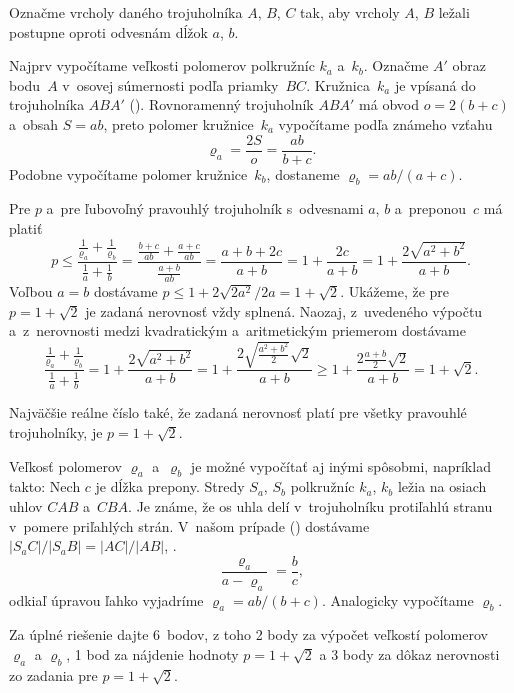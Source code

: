{%
Označme vrcholy daného trojuholníka $A$, $B$, $C$ tak, aby vrcholy $A$, $B$ ležali postupne oproti odvesnám dĺžok $a$, $b$.
%

Najprv vypočítame veľkosti polomerov polkružníc $k_a$ a~$k_b$. Označme $A'$ obraz bodu~$A$ v~osovej súmernosti podľa priamky~$BC$. Kružnica~$k_a$ je vpísaná do trojuholníka $ABA'$ (\obr). Rovnoramenný trojuholník $ABA'$ má obvod $o=2(b+c)$ a~obsah $S=ab$, preto polomer kružnice~$k_a$ vypočítame podľa známeho vzťahu
$$
\varrho_a = \frac{2S}o = \frac{ab}{b+c}.
$$
Podobne vypočítame polomer kružnice~$k_b$, dostaneme $\varrho_b=ab/(a+c)$.

Pre $p$ a~pre ľubovoľný pravouhlý trojuholník s~odvesnami $a$, $b$ a~preponou~$c$ má platiť
$$
p\le\frac{\frac1{\varrho_a}+\frac1{\varrho_b}}{\frac1a+\frac1b}=
\frac{\frac{b+c}{ab}+\frac{a+c}{ab}}{\frac{a+b}{ab}}=\frac{a+b+2c}{a+b}=1+\frac{2c}{a+b}=
1+\frac{2\sqrt{a^2+b^2}}{a+b}.
$$
Voľbou $a=b$ dostávame $p\le 1+2\sqrt{2a^2}/2a=1+\sqrt2$. Ukážeme, že pre $p=1+\sqrt2$ je zadaná nerovnosť vždy splnená. Naozaj, z~uvedeného výpočtu a~z~nerovnosti medzi kvadratickým a~aritmetickým priemerom dostávame
$$
\frac{\frac1{\varrho_a}+\frac1{\varrho_b}}{\frac1a+\frac1b}=
1+\frac{2\sqrt{a^2+b^2}}{a+b}=1+\frac{2\sqrt{\frac{a^2+b^2}2}\sqrt2}{a+b}\ge
1+\frac{2\frac{a+b}2\sqrt2}{a+b}
= 1+\sqrt 2.
$$

\odpoved
Najväčšie reálne číslo také, že zadaná nerovnosť platí pre všetky pravouhlé trojuholníky, je $p=1+\sqrt2$.
%

\poznamka
Veľkosť polomerov $\varrho_a$ a~$\varrho_b$ je možné vypočítať aj inými spôsobmi, napríklad takto: Nech $c$ je dĺžka prepony. Stredy $S_a$, $S_b$ polkružníc $k_a$, $k_b$ ležia na osiach uhlov $CAB$ a~$CBA$. Je známe, že os uhla delí v~trojuholníku protiľahlú stranu v~pomere priľahlých strán. V~našom prípade (\obr) dostávame $|S_aC|/|S_aB|=|AC|/|AB|$, \tj.
$$
\frac{\varrho_a}{a-\varrho_a}=\frac bc,
$$
odkiaľ úpravou ľahko vyjadríme $\varrho_a=ab/(b+c)$. Analogicky vypočítame $\varrho_b$.

\nobreak\medskip\petit\noindent
Za úplné riešenie dajte 6~bodov, z toho 2 body za výpočet veľkostí polomerov $\varrho_a$ a $\varrho_b$, 1 bod za nájdenie hodnoty $p=1+\sqrt{2}$ a 3 body za dôkaz nerovnosti zo zadania pre $p=1+\sqrt{2}$.
\endpetit
\bigbreak}

